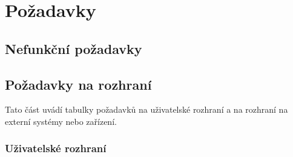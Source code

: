 \chapter{Požadavky}\label{appendix:pozadavky}



\section{Nefunkční požadavky}









\section{Požadavky na rozhraní}

Tato část uvádí tabulky požadavků na uživatelské rozhraní a na rozhraní na externí systémy nebo zařízení.

\FloatBarrier
\subsection{Uživatelské rozhraní}


















